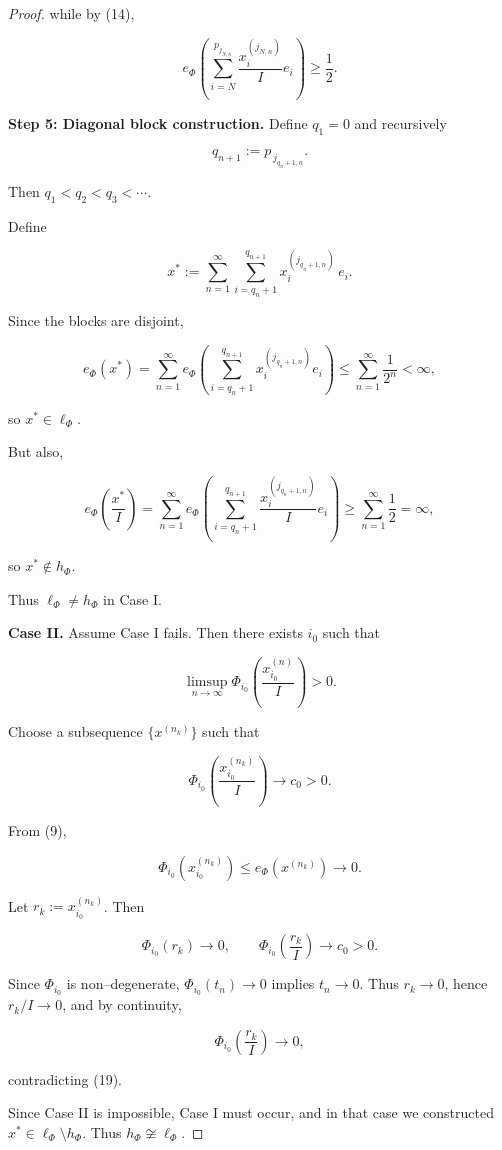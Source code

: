 \documentclass[10pt,a4paper]{amsart}
\begin{document}
\begin{proof}
{while by (14),


\[
e_\Phi\!\left(\sum_{i=N}^{p_{j_{N,n}}}
\frac{x^{(j_{N,n})}_i}{I} e_i\right)
\ge \frac12.
\tag{15}
\]



\medskip
\textbf{Step 5: Diagonal block construction.}
Define $q_1=0$ and recursively


\[
q_{n+1} := p_{\,j_{q_n+1,n}}.
\]


Then $q_1<q_2<q_3<\cdots$.

Define


\[
x^\ast := 
\sum_{n=1}^\infty 
\sum_{i=q_n+1}^{q_{n+1}}
x^{(j_{q_n+1,n})}_i\, e_i.
\]



Since the blocks are disjoint,


\[
e_\Phi(x^\ast)
= \sum_{n=1}^\infty 
e_\Phi\!\left(\sum_{i=q_n+1}^{q_{n+1}}
x^{(j_{q_n+1,n})}_i e_i\right)
\le \sum_{n=1}^\infty \frac{1}{2^n}
< \infty,
\]


so $x^\ast\in \ell_\Phi$.

But also,


\[
e_\Phi\!\left(\frac{x^\ast}{I}\right)
= \sum_{n=1}^\infty 
e_\Phi\!\left(\sum_{i=q_n+1}^{q_{n+1}}
\frac{x^{(j_{q_n+1,n})}_i}{I} e_i\right)
\ge \sum_{n=1}^\infty \frac12
= \infty,
\]


so $x^\ast\notin h_\Phi$.

Thus $\ell_\Phi\neq h_\Phi$ in Case I.

\bigskip
\noindent
\textbf{Case II.}  
Assume Case I fails.  
Then there exists $i_0$ such that


\[
\limsup_{n\to\infty}
\Phi_{i_0}\!\left(\frac{x^{(n)}_{i_0}}{I}\right) > 0.
\]


Choose a subsequence $\{x^{(n_k)}\}$ such that


\[
\Phi_{i_0}\!\left(\frac{x^{(n_k)}_{i_0}}{I}\right)
\to c_0 > 0.
\tag{16}
\]



From (9),


\[
\Phi_{i_0}\!\left(x^{(n_k)}_{i_0}\right)
\le e_\Phi(x^{(n_k)}) \to 0.
\tag{18}
\]



Let $r_k := x^{(n_k)}_{i_0}$.  
Then


\[
\Phi_{i_0}(r_k)\to 0,
\qquad
\Phi_{i_0}\!\left(\frac{r_k}{I}\right)\to c_0>0.
\tag{19}
\]



Since $\Phi_{i_0}$ is non--degenerate,  
$\Phi_{i_0}(t_n)\to 0$ implies $t_n\to 0$.  
Thus $r_k\to 0$, hence $r_k/I\to 0$, and by continuity,


\[
\Phi_{i_0}\!\left(\frac{r_k}{I}\right)\to 0,
\]


contradicting (19).

\bigskip
\noindent
Since Case II is impossible, Case I must occur, and in that case we constructed
$x^\ast\in \ell_\Phi\setminus h_\Phi$.  
Thus $h_\Phi\not\cong \ell_\Phi$.}
\end{proof}
\end{document}
